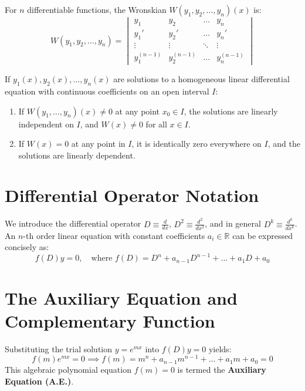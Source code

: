 \begin{definition}
For $n$ differentiable functions, the Wronskian $W(y_1, y_2, \dots, y_n)(x)$ is:
\begin{equation}
W(y_1, y_2, \dots, y_n) = \begin{vmatrix}
y_1 & y_2 & \dots & y_n \\
y_1' & y_2' & \dots & y_n' \\
\vdots & \vdots & \ddots & \vdots \\
y_1^{(n-1)} & y_2^{(n-1)} & \dots & y_n^{(n-1)}
\end{vmatrix}
\end{equation}
\end{definition}

\begin{theorem}
If $y_1(x), y_2(x), \dots, y_n(x)$ are solutions to a homogeneous linear differential equation with continuous coefficients on an open interval $I$:
\begin{enumerate}
    \item If $W(y_1, \dots, y_n)(x) \neq 0$ at any point $x_0 \in I$, the solutions are linearly independent on $I$, and $W(x) \neq 0$ for all $x \in I$.
    \item If $W(x) = 0$ at any point in $I$, it is identically zero everywhere on $I$, and the solutions are linearly dependent.
\end{enumerate}
\end{theorem}

\section{Differential Operator Notation}
We introduce the differential operator $D \equiv \frac{d}{dx}$, $D^2 \equiv \frac{d^2}{dx^2}$, and in general $D^k \equiv \frac{d^k}{dx^k}$.
An $n$-th order linear equation with constant coefficients $a_i \in \mathbb{R}$ can be expressed concisely as:
\begin{equation}
f(D)y = 0, \quad \text{where } f(D) = D^n + a_{n-1}D^{n-1} + \dots + a_1 D + a_0
\end{equation}

\section{The Auxiliary Equation and Complementary Function}
Substituting the trial solution $y = e^{mx}$ into $f(D)y = 0$ yields:
\begin{equation}
f(m)e^{mx} = 0 \implies f(m) = m^n + a_{n-1}m^{n-1} + \dots + a_1 m + a_0 = 0
\end{equation}
This algebraic polynomial equation $f(m) = 0$ is termed the \textbf{Auxiliary Equation (A.E.)}.

